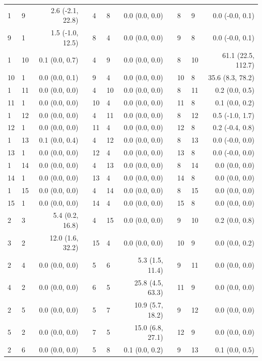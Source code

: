 \begin{xltabular}{\textwidth}{llrp{0.2cm}llrp{0.2cm}llr}
    1 & 9 & 2.6 (-2.1, 22.8) & & 4 & 8 & 0.0 (0.0, 0.0) & & 8 & 9 & 0.0 (-0.0, 0.1) \\
    9 & 1 & 1.5 (-1.0, 12.5) & & 8 & 4 & 0.0 (0.0, 0.0) & & 9 & 8 & 0.0 (-0.0, 0.1) \\
    1 & 10 & 0.1 (0.0, 0.7) & & 4 & 9 & 0.0 (0.0, 0.0) & & 8 & 10 & 61.1 (22.5, 112.7) \\
    10 & 1 & 0.0 (0.0, 0.1) & & 9 & 4 & 0.0 (0.0, 0.0) & & 10 & 8 & 35.6 (8.3, 78.2) \\
    1 & 11 & 0.0 (0.0, 0.0) & & 4 & 10 & 0.0 (0.0, 0.0) & & 8 & 11 & 0.2 (0.0, 0.5) \\
    11 & 1 & 0.0 (0.0, 0.0) & & 10 & 4 & 0.0 (0.0, 0.0) & & 11 & 8 & 0.1 (0.0, 0.2) \\
    1 & 12 & 0.0 (0.0, 0.0) & & 4 & 11 & 0.0 (0.0, 0.0) & & 8 & 12 & 0.5 (-1.0, 1.7) \\
    12 & 1 & 0.0 (0.0, 0.0) & & 11 & 4 & 0.0 (0.0, 0.0) & & 12 & 8 & 0.2 (-0.4, 0.8) \\
    1 & 13 & 0.1 (0.0, 0.4) & & 4 & 12 & 0.0 (0.0, 0.0) & & 8 & 13 & 0.0 (-0.0, 0.0) \\
    13 & 1 & 0.0 (0.0, 0.0) & & 12 & 4 & 0.0 (0.0, 0.0) & & 13 & 8 & 0.0 (-0.0, 0.0) \\
    1 & 14 & 0.0 (0.0, 0.0) & & 4 & 13 & 0.0 (0.0, 0.0) & & 8 & 14 & 0.0 (0.0, 0.0) \\
    14 & 1 & 0.0 (0.0, 0.0) & & 13 & 4 & 0.0 (0.0, 0.0) & & 14 & 8 & 0.0 (0.0, 0.0) \\
    1 & 15 & 0.0 (0.0, 0.0) & & 4 & 14 & 0.0 (0.0, 0.0) & & 8 & 15 & 0.0 (0.0, 0.0) \\
    15 & 1 & 0.0 (0.0, 0.0) & & 14 & 4 & 0.0 (0.0, 0.0) & & 15 & 8 & 0.0 (0.0, 0.0) \\
    2 & 3 & 5.4 (0.2, 16.8) & & 4 & 15 & 0.0 (0.0, 0.0) & & 9 & 10 & 0.2 (0.0, 0.8) \\
    3 & 2 & 12.0 (1.6, 32.2) & & 15 & 4 & 0.0 (0.0, 0.0) & & 10 & 9 & 0.0 (0.0, 0.2) \\
    2 & 4 & 0.0 (0.0, 0.0) & & 5 & 6 & 5.3 (1.5, 11.4) & & 9 & 11 & 0.0 (0.0, 0.0) \\
    4 & 2 & 0.0 (0.0, 0.0) & & 6 & 5 & 25.8 (4.5, 63.3) & & 11 & 9 & 0.0 (0.0, 0.0) \\
    2 & 5 & 0.0 (0.0, 0.0) & & 5 & 7 & 10.9 (5.7, 18.2) & & 9 & 12 & 0.0 (0.0, 0.0) \\
    5 & 2 & 0.0 (0.0, 0.0) & & 7 & 5 & 15.0 (6.8, 27.1) & & 12 & 9 & 0.0 (0.0, 0.0) \\
    2 & 6 & 0.0 (0.0, 0.0) & & 5 & 8 & 0.1 (0.0, 0.2) & & 9 & 13 & 0.1 (0.0, 0.5) \\

\end{xltabular}
